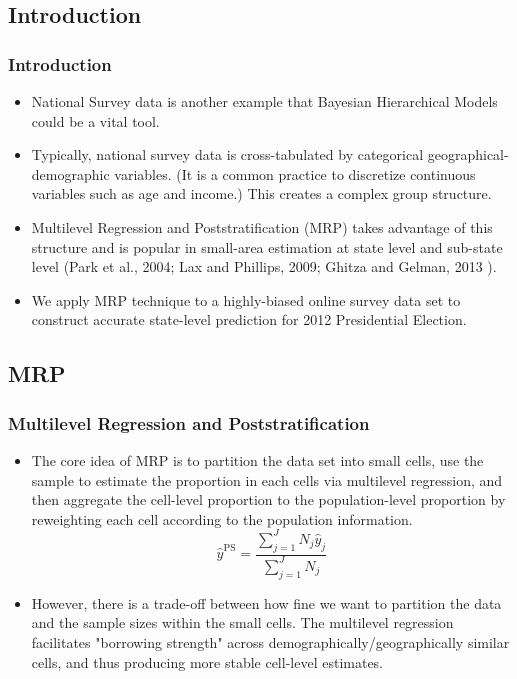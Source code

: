 \documentclass[xetex,mathserif,serif]{beamer}
\begin{document}
\subsection{Introduction}
\begin{frame}
  \frametitle{Introduction}
  \begin{itemize}
  \item National Survey data is another example that Bayesian Hierarchical Models
    could be a vital tool.
  \item Typically, national survey data is cross-tabulated by
    categorical geographical-demographic variables. (It is a common practice to
    discretize continuous variables such as age and income.) This creates a complex
    group structure. 
    \pause
  \item Multilevel Regression and Poststratification (MRP) takes advantage of
    this structure and is popular in small-area estimation at state level and
    sub-state level (Park et al., 2004; Lax and Phillips, 2009; Ghitza and
    Gelman, 2013 ).
  \item We apply MRP technique to a highly-biased online survey data set to
    construct accurate state-level prediction for 2012 Presidential Election.
  \end{itemize}
\end{frame}
\subsection{MRP}
\begin{frame}
  \frametitle{Multilevel Regression and Poststratification}
  \begin{itemize}
  \item The core idea of MRP is to partition the data set into small cells, use
    the sample to estimate the proportion in each cells via multilevel
    regression, and then aggregate the cell-level proportion to the
    population-level proportion by reweighting each cell according to the
    population information.
    \[\hat{y}^{\text{PS}}=\frac{\sum_{j=1}^JN_j\hat{y}_j}{\sum_{j=1}^JN_j}\]
  \item However, there is a trade-off between how fine we want to partition the
    data and the sample sizes within the small cells. The multilevel regression
    facilitates "borrowing strength" across demographically/geographically
    similar cells, and thus producing more stable cell-level estimates.
  \end{itemize}
\end{frame}
\end{document}
